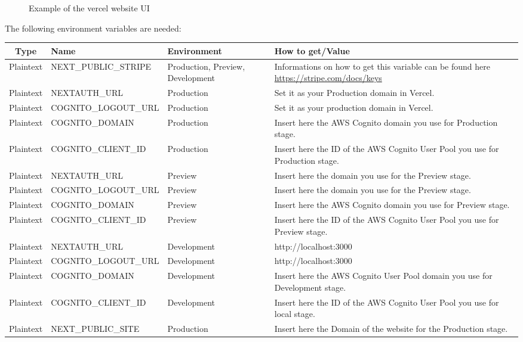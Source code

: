 \begin{enumerate}
\begin{figure}[H]
\caption{Example of the vercel website UI}
\end{figure}
The following environment variables are needed:\\
\setcounter{table}{-1}
{
\centering
\renewcommand{\arraystretch}{1.5}
\begin{longtable}{c C{6cm} C{3cm} C{5cm}}
\textbf{Type} &
\textbf{Name} &
\textbf{Environment} &
\textbf{How to get/Value}\\
\endhead

Plaintext & NEXT\_PUBLIC\_STRIPE & Production, Preview, Development & Informations on how to get this variable can be found here \url{https://stripe.com/docs/keys}\\
Plaintext & NEXTAUTH\_URL & Production & Set it as your Production domain in Vercel.\\
Plaintext & COGNITO\_LOGOUT\_URL & Production & Set it as your production domain in Vercel.\\
Plaintext & COGNITO\_DOMAIN & Production & Insert here the AWS Cognito domain you use for Production stage.\\
Plaintext & COGNITO\_CLIENT\_ID & Production & Insert here the ID of the AWS Cognito User Pool you use for Production stage.\\
Plaintext & NEXTAUTH\_URL & Preview & Insert here the domain you use for the Preview stage.\\
Plaintext & COGNITO\_LOGOUT\_URL & Preview & Insert here the domain you use for the Preview stage.\\
Plaintext & COGNITO\_DOMAIN & Preview & Insert here the AWS Cognito domain you use for Preview stage.\\
Plaintext & COGNITO\_CLIENT\_ID & Preview & Insert here the ID of the AWS Cognito User Pool you use for Preview stage.\\
Plaintext & NEXTAUTH\_URL & Development & http://localhost:3000 \\
Plaintext & COGNITO\_LOGOUT\_URL & Development & http://localhost:3000 \\
Plaintext & COGNITO\_DOMAIN & Development & Insert here the AWS Cognito User Pool domain you use for Development stage.\\
Plaintext & COGNITO\_CLIENT\_ID & Development & Insert here the ID of the AWS Cognito User Pool you use for local stage.\\
Plaintext & NEXT\_PUBLIC\_SITE & Production & Insert here the Domain of the website for the Production stage.\\

\end{longtable}}
\end{enumerate}
